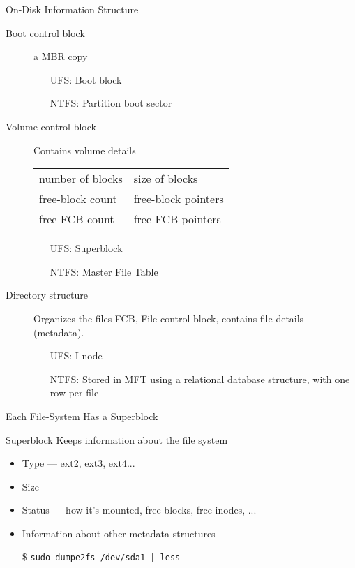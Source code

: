 \begin{frame}{On-Disk Information Structure}
  \begin{description}
  \item[Boot control block] a MBR copy
    \begin{itemize}
    \item[UFS:] Boot block
    \item[NTFS:] Partition boot sector
    \end{itemize}
  \item[Volume control block] Contains volume details
    \begin{center}
      \begin{tabular}{ll}
        number of blocks& size of blocks\\
        free-block count& free-block pointers\\
        free FCB count& free FCB pointers
      \end{tabular}
    \end{center}
    \begin{itemize}
    \item[UFS:] Superblock
    \item[NTFS:] Master File Table
    \end{itemize}
  \item[Directory structure] Organizes the files \alert{FCB}, \alert{File control block},
    contains file details (metadata).
    \begin{itemize}
    \item[UFS:] I-node
    \item[NTFS:] Stored in MFT using a relational database structure, with one row per
      file
    \end{itemize}
  \end{description}
\end{frame}

\begin{frame}{Each File-System Has a Superblock}
  \begin{block}{Superblock}
    Keeps information about the file system
    \begin{itemize}
    \item Type --- ext2, ext3, ext4...
    \item Size
    \item Status --- how it's mounted, free blocks, free inodes, ...
    \item Information about other metadata structures
    \end{itemize}
  \end{block}
  \begin{itemize}
  \item[\$] \texttt{sudo dumpe2fs /dev/sda1 | less}
  \end{itemize}
\end{frame}

